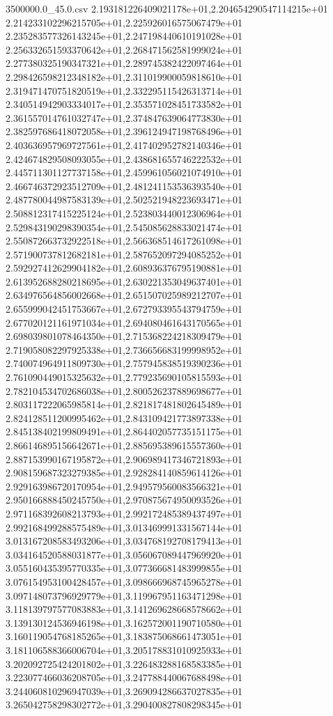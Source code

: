 \begin{filecontents*}{3500000.0_45.0.csv}
2.193181226409021178e+01,2.204654290547114215e+01
2.214233102296215705e+01,2.225926016575067479e+01
2.235283577326143245e+01,2.247198440610191028e+01
2.256332651593370642e+01,2.268471562581999024e+01
2.277380325190347321e+01,2.289745382422097464e+01
2.298426598212348182e+01,2.311019900059818610e+01
2.319471470751820519e+01,2.332295115426313714e+01
2.340514942903334017e+01,2.353571028451733582e+01
2.361557014761032747e+01,2.374847639064773830e+01
2.382597686418072058e+01,2.396124947198768496e+01
2.403636957969727561e+01,2.417402952782140346e+01
2.424674829508093055e+01,2.438681655746222532e+01
2.445711301127737158e+01,2.459961056021074910e+01
2.466746372923512709e+01,2.481241153536393540e+01
2.487780044987583139e+01,2.502521948223693471e+01
2.508812317415225124e+01,2.523803440012306964e+01
2.529843190298390354e+01,2.545085628833021474e+01
2.550872663732922518e+01,2.566368514617261098e+01
2.571900737812682181e+01,2.587652097294085252e+01
2.592927412629904182e+01,2.608936376795190881e+01
2.613952688280218695e+01,2.630221353049637401e+01
2.634976564856002668e+01,2.651507025989212707e+01
2.655999042451753667e+01,2.672793395543794759e+01
2.677020121161971034e+01,2.694080461643170565e+01
2.698039801078464350e+01,2.715368224218309479e+01
2.719058082297925338e+01,2.736656683199998952e+01
2.740074964911809730e+01,2.757945838519390236e+01
2.761090449015325632e+01,2.779235690105815593e+01
2.782104534702686038e+01,2.800526237889698677e+01
2.803117222065985814e+01,2.821817481802645489e+01
2.824128511200995462e+01,2.843109421773897338e+01
2.845138402199809491e+01,2.864402057735151175e+01
2.866146895156642671e+01,2.885695389615557360e+01
2.887153990167195872e+01,2.906989417346721893e+01
2.908159687323279385e+01,2.928284140859614126e+01
2.929163986720170954e+01,2.949579560083566321e+01
2.950166888450245750e+01,2.970875674950093526e+01
2.971168392608213793e+01,2.992172485389437497e+01
2.992168499288575489e+01,3.013469991331567144e+01
3.013167208583493206e+01,3.034768192708179413e+01
3.034164520588031877e+01,3.056067089447969920e+01
3.055160435395770335e+01,3.077366681483999855e+01
3.076154953100428457e+01,3.098666968745965278e+01
3.097148073796929779e+01,3.119967951163471298e+01
3.118139797577083883e+01,3.141269628668578662e+01
3.139130124536946198e+01,3.162572001190710580e+01
3.160119054768185265e+01,3.183875068661473051e+01
3.181106588366006704e+01,3.205178831010925933e+01
3.202092725424201802e+01,3.226483288168583385e+01
3.223077466036208705e+01,3.247788440067688498e+01
3.244060810296947039e+01,3.269094286637027835e+01
3.265042758298302772e+01,3.290400827808298345e+01

\end{filecontents*}
